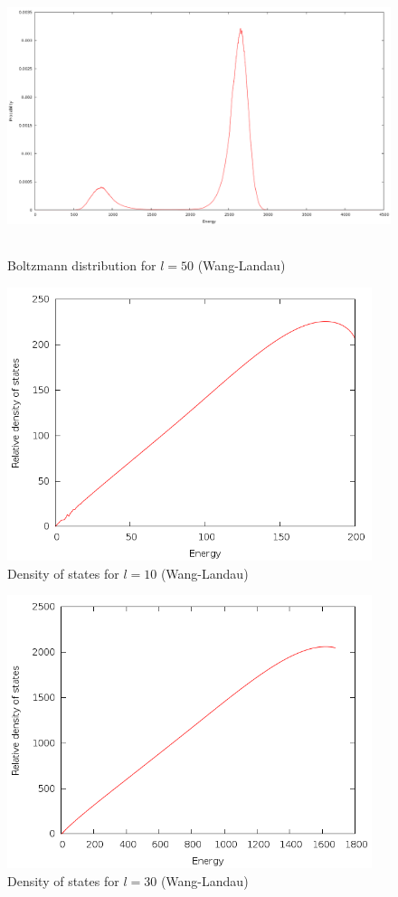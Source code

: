 \documentclass{article}
\begin{document}
\begin{figure}[h]
\includegraphics[height=8cm]{../results/wanglandau/b50.png}
\caption{Boltzmann distribution for $l = 50$ (Wang-Landau)}
\label{fig:b50}
\end{figure}

\begin{figure}[h]
\includegraphics[height=8cm]{../results/wanglandau/s10.png}
\caption{Density of states for $l = 10$ (Wang-Landau)}
\label{fig:s10}
\end{figure}

\begin{figure}[h]
\includegraphics[height=8cm]{../results/wanglandau/s30.png}
\caption{Density of states for $l = 30$ (Wang-Landau)}
\label{fig:s30}
\end{figure}
\end{document}
